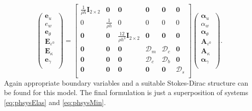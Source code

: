 \begin{equation}
\begin{pmatrix}
\bm{e}_u \\
e_w \\
\bm{e}_{\theta} \\
\bm{E}_{\varepsilon^0} \\
\bm{E}_{\kappa} \\
\bm{e}_{\gamma} \\
\end{pmatrix}
 = 
\begin{bmatrix}
\frac{1}{\rho h}\bm{I}_{2 \times 2} & \bm{0} & \bm{0} &  \bm{0} & \bm{0} & \bm{0} \\
0 & \frac{1}{\rho h} & 0 & 0  & 0 & 0 \\
\bm{0} & \bm{0} & \frac{12}{\rho h^3}\bm{I}_{2 \times 2} & \bm{0} & \bm{0} & \bm{0}\\
\bm{0} & \bm{0} & \bm{0} & \bm{\mathcal{D}}_m & \bm{\mathcal{D}}_c & \bm{0} \\
\bm{0} & \bm{0} & \bm{0} & \bm{\mathcal{D}}_c & \bm{\mathcal{D}}_b & \bm{0}\\
\bm{0} & \bm{0} & \bm{0} & \bm{0} & \bm{0} & \bm{\mathcal{D}}_s \\
\end{bmatrix}
\begin{pmatrix}
\bm\alpha_u \\
\alpha_w \\
\bm\alpha_\theta \\
\bm{A}_{\varepsilon^0} \\
\bm{A}_\kappa \\
\bm\alpha_{\gamma} \\
\end{pmatrix}.
\end{equation}
Again appropriate boundary variables and a suitable Stokes-Dirac structure can be found for this model. The final formulation is just a superposition of systems \eqref{eq:phsysElas} and \eqref{eq:phsysMin}.

